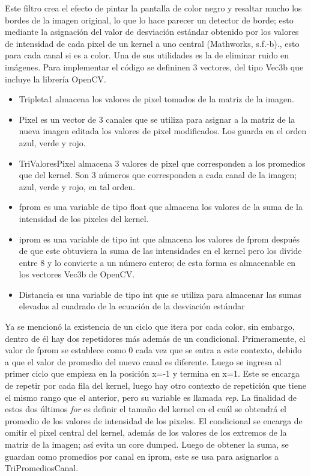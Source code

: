 \documentclass[11pt]{article}
\begin{document}
Este filtro crea el efecto de pintar la pantalla de color negro y resaltar mucho los bordes de la imagen original, lo que lo hace parecer un detector de borde; esto mediante la asignación del valor de desviación estándar obtenido por los valores de intensidad de cada pixel de un kernel a uno central (Mathworks, s.f.-b)., esto para cada canal si es a color. Una de sus utilidades es la de eliminar ruido en imágenes. Para implementar el código se defininen 3 vectores, del tipo Vec3b que incluye la librería OpenCV. 

\begin{itemize}
    \item Tripleta1 almacena los valores de pixel tomados de la matriz de la imagen.
    \item Pixel es un vector de 3 canales que se utiliza para asignar a la matriz de la nueva imagen editada los valores de pixel modificados. Los guarda en el orden azul, verde y rojo.
    \item TriValoresPixel almacena 3 valores de pixel que corresponden a los promedios que del kernel. Son 3 números que corresponden a cada canal de la imagen; azul, verde y rojo, en tal orden.
    \item fprom es una variable de tipo float que almacena los valores de la suma de la intensidad de los pixeles del kernel.
    \item iprom es una variable de tipo int que almacena los valores de fprom después de que este obtuviera la suma de las intensidades en el kernel pero los divide entre 8 y lo convierte a un número entero; de esta forma es almacenable en los vectores Vec3b de OpenCV.
    \item Distancia es una variable de tipo int que se utiliza para almacenar las sumas elevadas al cuadrado de la ecuación de la desviación estándar
\end{itemize}

Ya se mencionó la existencia de un ciclo que itera por cada color, sin embargo, dentro de él hay dos repetidores más además de un condicional. Primeramente, el valor de fprom se establece como 0 cada vez que se entra a este contexto, debido a que el valor de promedio del nuevo canal es diferente. Luego se ingresa al primer ciclo que empieza en la posición x=-1 y termina en x=1. Este se encarga de repetir por cada fila del kernel, luego hay otro contexto de repetición que tiene el mismo rango que el anterior, pero su variable es llamada \textit{rep}. La finalidad de estos dos últimos \textit{for} es definir el tamaño del kernel en el cuál se obtendrá el promedio de los valores de intensidad de los pixeles. El condicional se encarga de omitir el pixel central del kernel, además de los valores de los extremos de la matriz de la imagen; así evita un core dumped.
Luego de obtener la suma, se guardan como promedios por canal en iprom, este se usa para asignarlos a TriPromediosCanal.\\
\end{document}
